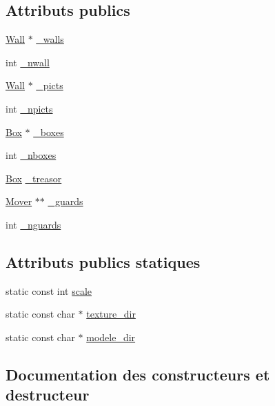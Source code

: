 \subsection*{Attributs publics}
\begin{DoxyCompactItemize}
\item 
\hyperlink{structWall}{Wall} $\ast$ \hyperlink{classEnvironnement_ad7db3beb18b180b5c132f36228f914bf}{\+\_\+walls}
\item 
int \hyperlink{classEnvironnement_a0acbc48c7cf4b59bf973ce741fc6af61}{\+\_\+nwall}
\item 
\hyperlink{structWall}{Wall} $\ast$ \hyperlink{classEnvironnement_adbe17c962f07d4def3e2edf579462fc0}{\+\_\+picts}
\item 
int \hyperlink{classEnvironnement_a0470d88c2e3e55eee41cb119deb412b9}{\+\_\+npicts}
\item 
\hyperlink{structBox}{Box} $\ast$ \hyperlink{classEnvironnement_ab32874eb0b8a28d5bde0b2d46bae6115}{\+\_\+boxes}
\item 
int \hyperlink{classEnvironnement_a8451eb91d83b9f2368bf739afb56187e}{\+\_\+nboxes}
\item 
\hyperlink{structBox}{Box} \hyperlink{classEnvironnement_a1d774f2021c1db814bfea3accdaf534a}{\+\_\+treasor}
\item 
\hyperlink{classMover}{Mover} $\ast$$\ast$ \hyperlink{classEnvironnement_a9dca8e24e5dde03341cb9a2156232906}{\+\_\+guards}
\item 
int \hyperlink{classEnvironnement_a2af64d36a567edf8b6f359ce94ef181b}{\+\_\+nguards}
\end{DoxyCompactItemize}
\subsection*{Attributs publics statiques}
\begin{DoxyCompactItemize}
\item 
static const int \hyperlink{classEnvironnement_ab4246782b933af447e3cb2692180dafe}{scale}
\item 
static const char $\ast$ \hyperlink{classEnvironnement_a70c437280e85144533da98532bd8e910}{texture\+\_\+dir}
\item 
static const char $\ast$ \hyperlink{classEnvironnement_a8296fdb8c70e56b61adbefac0630cc97}{modele\+\_\+dir}
\end{DoxyCompactItemize}


\subsection{Documentation des constructeurs et destructeur}
\mbox{\label{classEnvironnement_a6754a865157f3f38e8243ed3cbe63993}} 
